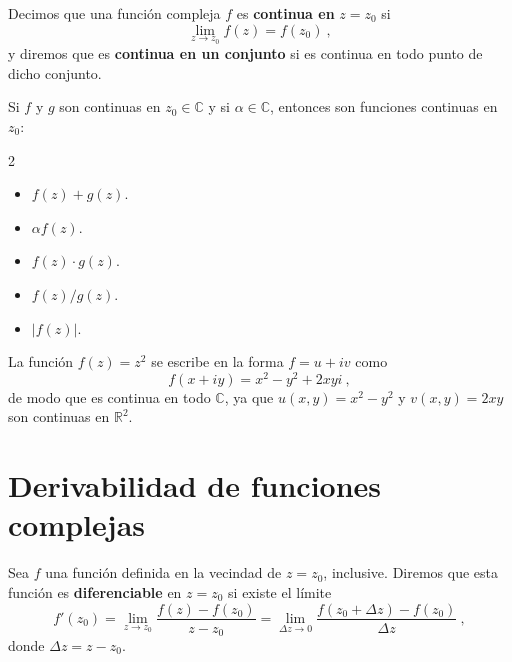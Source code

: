 \begin{defi} 
    Decimos que una función compleja $f$ es \textbf{continua en} $z = z_0$ si 
    \begin{equation*}
        \lim_{z \to z_0} f(z) = f(z_0) \ ,
    \end{equation*}
    y diremos que es \textbf{continua en un conjunto} si es continua en todo punto de dicho conjunto.
\end{defi}

\begin{corolario}
    Si $f$ y $g$ son continuas en $z_0 \in \mathbb{C}$ y si $\alpha \in \mathbb{C}$, entonces son funciones continuas en $z_0$:
    \begin{multicols}{2}
        \begin{itemize}
            \item $f(z) + g(z)$.
            \item $\alpha f(z)$.
            \item $f(z) \cdot g(z)$.
            \item $f(z) / g(z)$.
            \item $|f(z)|$.
        \end{itemize} 
    \end{multicols}
\end{corolario}

\begin{ejemplo}
    La función $f(z) = z^2$ se escribe en la forma $f = u + iv$ como
    \begin{equation*}
        f(x+iy) = x^2 - y^2 + 2xyi \ ,
    \end{equation*}
    de modo que es continua en todo $\mathbb{C}$, ya que $u(x,y) = x^2 - y^2$ y $v(x,y) = 2xy$ son continuas en $\mathbb{R}^2$.
\end{ejemplo}


\section{Derivabilidad de funciones complejas}

\begin{defi} 
    Sea $f$ una función definida en la vecindad de $z = z_0$, inclusive. Diremos que esta función es \textbf{diferenciable} en $z = z_0$ si existe el límite
    \begin{equation}
        f'(z_0) = \lim_{z \to z_0} \frac{f(z) - f(z_0)}{z - z_0} = \lim_{\Delta z \to 0} \frac{f(z_0 + \Delta z) - f(z_0)}{\Delta z} \ ,
    \end{equation}
    donde $\Delta z = z - z_0$.
\end{defi}

